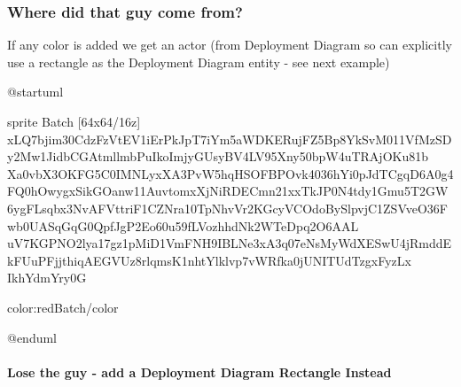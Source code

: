\documentclass[letterpaper,10pt,english]{sphinxmanual}
\begin{document}
\subsubsection{Where did that guy come from?}
\label{\detokenize{StdlibUnderTheHood/StdlibUnderstanding:where-did-that-guy-come-from}}
If any color is added we get an actor (from Deployment Diagram so can
explicitly use a rectangle as the Deployment Diagram entity - see next
example)

\begin{figure}[htbp]
\centering

\end{figure}

%
\begin{sphinxVerbatim}[commandchars=\\\{\},numbers=left,firstnumber=1,stepnumber=1]
@startuml 


sprite \PYGZdl{}Batch [64x64/16z] \PYGZob{}
xLQ7bjim30CdzFzVtEV1iErPkJpT7iYm5aWDKERujFZ5Bp8YkSvM011VfMzSDy2Mw1JidbCGAtmllmbPuIkoImjyGUsyBV4LV95\PYGZus{}Xny50bpW4uTRAjOKu81b
Xa0vbX3OKFG5C0IMNLyxXA\PYGZus{}3PvW5hqHSOFBP\PYGZus{}Ovk4036hYi0pJdTCgqD6A0g4FQ0hOwygxSikGOanw11AuvtomxXjNiRDECmn21xxTkJP0N4tdy1Gmu5T2GW
6ygFL\PYGZus{}sqbx3NvA\PYGZus{}FVtt\PYGZus{}ri\PYGZus{}F1CZNra\PYGZhy{}10TpNhvVr2KGcyVCOdoBySlpv\PYGZhy{}jC1ZSVveO36\PYGZus{}Fwb0UASqGqG0QpfJgP2Eo60u59\PYGZhy{}fLVozhhdNk2WTeDpq2O6AAL\PYGZus{}
uV7KGPNO2lya17gz1pMiD1VmFNH9IBLNe3xA3q07eNsMy\PYGZus{}WdXESwU4jRmddEk\PYGZhy{}FUuPFjjthiqAEGVUz8rlqmsK1nhtYlklvp7vWRfka0jUNITUdTzgxFyzLx
\PYGZhy{}Ikh\PYGZus{}YdmYr\PYGZus{}y0G
\PYGZcb{}

\PYGZdq{}\PYGZlt{}color:red\PYGZgt{}\PYGZlt{}\PYGZdl{}Batch\PYGZgt{}\PYGZlt{}/color\PYGZgt{}\PYGZdq{}

@enduml
\end{sphinxVerbatim}
\sphinxresetverbatimhllines


\paragraph{Lose the guy - add a Deployment Diagram Rectangle Instead}
\label{\detokenize{StdlibUnderTheHood/StdlibUnderstanding:lose-the-guy-add-a-deployment-diagram-rectangle-instead}}
\begin{figure}[htbp]
\centering

\end{figure}
\end{document}
